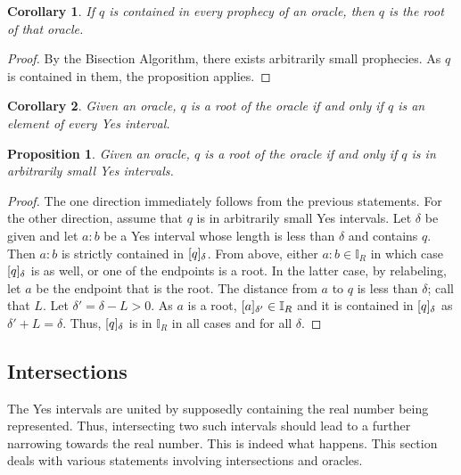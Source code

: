 \documentclass[12pt]{article}
\newtheorem{corollary}{Corollary}[section]
\newtheorem{proposition}{Proposition}[section]
\begin{document}
\begin{corollary}\label{os:root}
    If $q$ is contained in every prophecy of an oracle, then $q$ is the root of that oracle. 
\end{corollary}

\begin{proof}
    By the Bisection Algorithm, there exists arbitrarily small prophecies. As $q$ is contained in them, the proposition applies. 
\end{proof}



\begin{corollary}
    Given an oracle, $q$ is a root of the oracle if and only if $q$ is an element of every Yes interval. 
\end{corollary}

\begin{proposition}
    Given an oracle, $q$ is a root of the oracle if and only if $q$ is in arbitrarily small Yes intervals. 
\end{proposition}

\begin{proof}
   The one direction immediately follows from the previous statements. For the other direction, assume that $q$ is in arbitrarily small Yes intervals. Let $\delta$ be given and let $a:b$ be a Yes interval whose length is less than $\delta$ and contains $q$. Then $a:b$ is strictly contained in $\halo{q}$. From above, either $a:b \in \mathbb{I}_R$ in which case $\halo{q}$ is as well, or one of the endpoints is a root. In the latter case, by relabeling, let $a$ be the endpoint that is the root. The distance from $a$ to $q$ is less than $\delta$; call that $L$. Let $\delta' = \delta - L > 0$. As $a$ is a root, $\halo[\delta']{a} \in \mathbb{I}_R$ and it is contained in $\halo{q}$ as $\delta' + L = \delta$. Thus, $\halo{q}$ is in $\mathbb{I}_R$ in all cases and for all $\delta$.
\end{proof}


\subsection{Intersections}

The Yes intervals are united by supposedly containing the real number being represented. Thus, intersecting two such intervals should lead to a further narrowing towards the real number. This is indeed what happens. This section deals with various statements involving intersections and oracles. 
\end{document}

